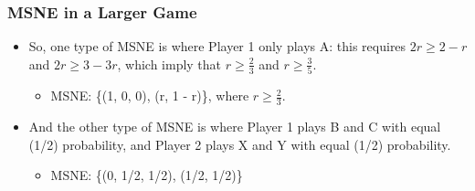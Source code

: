 \begin{frame}
\frametitle{MSNE in a Larger Game}
\begin{itemize}
	\item So, one type of MSNE is where Player 1 only plays A: this requires $2r \geq 2 - r$ and $2r \geq 3 - 3r$, which imply that $r \geq \frac{2}{3}$ and $r \geq \frac{3}{5}$.
	\begin{itemize}
		\item MSNE: \{(1, 0, 0), (r, 1 - r)\}, where $r \geq \frac{2}{3}$.
	\end{itemize}
	\item And the other type of MSNE is where Player 1 plays B and C with equal (1/2) probability, and Player 2 plays X and Y with equal (1/2) probability.
	\begin{itemize}
		\item MSNE: \{(0, 1/2, 1/2), (1/2, 1/2)\}
	\end{itemize}
\end{itemize}
\end{frame}

